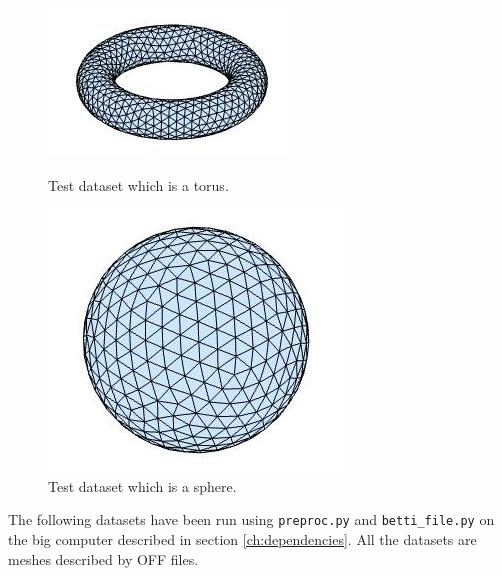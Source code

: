 \documentclass[11pt,a4paper,twoside]{report}
\begin{document}
\begin{figure}[H]
\begin{minipage}[b]{0.45\linewidth}
\center
\includegraphics[scale=0.5]{torus.jpg}
\caption{Test dataset which is a torus.}
\label{fig:mesh_torus}
\end{minipage}
\hspace{0.5cm}
\begin{minipage}[b]{0.45\linewidth}
\center
\includegraphics[scale=0.5]{sphere.jpg}
\caption{Test dataset which is a sphere.}
\label{fig:mesh_sphere}
\end{minipage}
\end{figure}
The following datasets have been run using \texttt{preproc.py} and \texttt{betti\_file.py} on the big computer described in section \ref{ch:dependencies}. All the datasets are meshes described by OFF files. 
\end{document}
